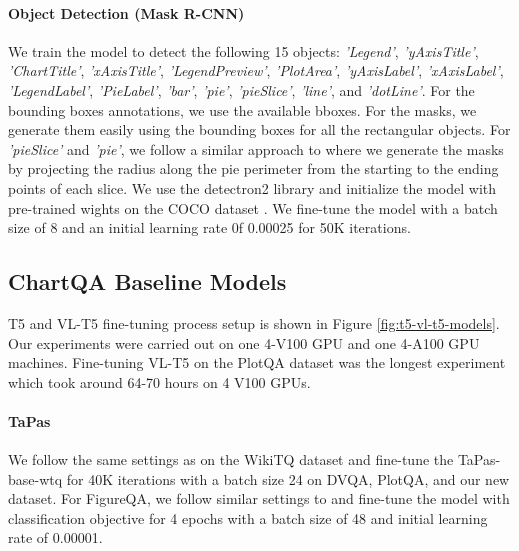 \paragraph{Object Detection (Mask R-CNN)}
We train the model to detect the following 15 objects: \textit{'Legend'}, \textit{'yAxisTitle'}, \textit{'ChartTitle'}, \textit{'xAxisTitle'}, \textit{'LegendPreview'}, \textit{'PlotArea'}, \textit{'yAxisLabel'}, \textit{'xAxisLabel'}, \textit{'LegendLabel'}, \textit{'PieLabel'}, \textit{'bar'}, \textit{'pie'}, \textit{'pieSlice'}, \textit{'line'}, and \textit{'dotLine'}. For the bounding boxes annotations, we use the available bboxes. For the masks, we generate them easily using the bounding boxes for all the rectangular objects. For \textit{'pieSlice'}  and \textit{'pie'}, we follow a similar approach to \cite{stlcqa} where we generate the masks by projecting the radius along the pie perimeter from the starting to the ending points of each slice. We use the detectron2 library \cite{detectron2} and initialize the model with pre-trained wights on the COCO dataset \cite{coco}. We fine-tune the model with a batch size of 8 and an initial learning rate 0f 0.00025 for 50K iterations.

\subsection{ChartQA Baseline Models}
\label{app:baselines}

T5 and VL-T5 fine-tuning process setup is shown in Figure \ref{fig:t5-vl-t5-models}. 
Our experiments were carried out on one 4-V100 GPU and one 4-A100 GPU machines. Fine-tuning VL-T5 on the PlotQA dataset was the longest experiment which took around 64-70 hours on 4 V100 GPUs. 

\paragraph{TaPas} We follow the same settings as \cite{tapas} on the WikiTQ dataset \cite{sempre} and fine-tune the TaPas-base-wtq for 40K iterations with a batch size 24 on DVQA, PlotQA, and our new dataset. For FigureQA, we follow similar settings to \cite{tabfact} and fine-tune the model with classification objective for 4 epochs with a batch size of 48 and initial learning rate of 0.00001.

